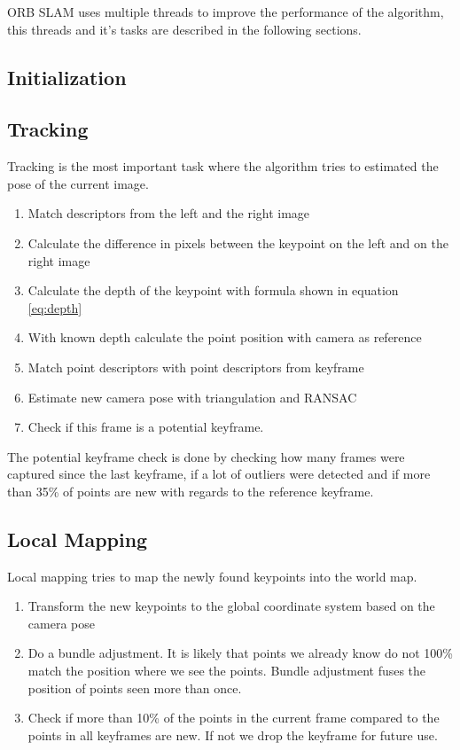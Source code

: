 \documentclass[11pt,a4paper,titlepage,oneside]{report}
\begin{document}
ORB SLAM uses multiple threads to improve the performance of the algorithm, this threads and it's tasks are described in the following sections.

\subsection{Initialization}

\subsection{Tracking}

Tracking is the most important task where the algorithm tries to estimated the pose of the current image.
\begin{enumerate}
	\item Match descriptors from the left and the right image
	\item Calculate the difference in pixels between the keypoint on the left and on the right image
	\item Calculate the depth of the keypoint with formula shown in equation \ref{eq:depth}
	\item With known depth calculate the point position with camera as reference
	\item Match point descriptors with point descriptors from keyframe
	\item Estimate new camera pose with triangulation and RANSAC
	\item Check if this frame is a potential keyframe.
\end{enumerate}
The potential keyframe check is done by checking how many frames were captured since the last keyframe, if a lot of outliers were detected and if more than 35\% of points are new with regards to the reference keyframe.\\

\subsection{Local Mapping}
Local mapping tries to map the newly found keypoints into the world map.
\begin{enumerate}
	\item Transform the new keypoints to the global coordinate system based on the camera pose
	\item Do a bundle adjustment. It is likely that points we already know do not 100\% match the position where we see the points. Bundle adjustment fuses the position of points seen more than once.
	\item Check if more than 10\% of the points in the current frame compared to the points in all keyframes are new. If not we drop the keyframe for future use.
\end{enumerate}
\end{document}
